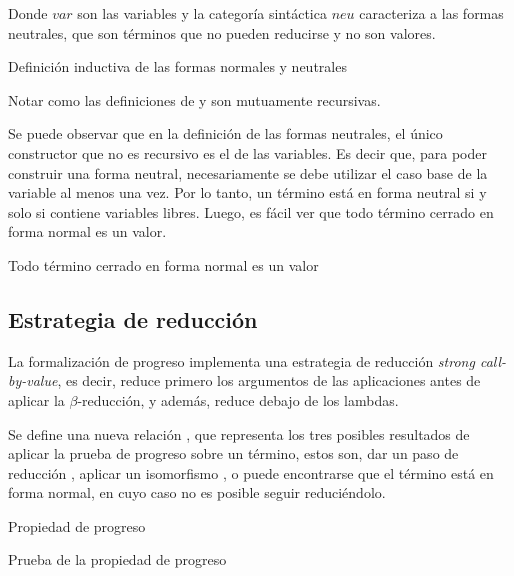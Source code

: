 Donde $var$ son las variables y la categoría sintáctica $neu$ caracteriza a las formas neutrales, que son términos que no pueden reducirse y no son valores.

\begin{codigo}
	Definición inductiva de las formas normales y neutrales
\end{codigo}

Notar como las definiciones de \const{$\Uparrow$} y \const{$\Downarrow$} son mutuamente recursivas.

Se puede observar que en la definición de las formas neutrales, el único constructor que no es recursivo es el de las variables.
Es decir que, para poder construir una forma neutral, necesariamente se debe utilizar el caso base de la variable al menos una vez.
Por lo tanto, un término está en forma neutral si y solo si contiene variables libres.
Luego, es fácil ver que todo término cerrado en forma normal es un valor.

\begin{codigo}
	Todo término cerrado en forma normal es un valor
\end{codigo}

\subsection{Estrategia de reducción}

La formalización de progreso implementa una estrategia de reducción \textit{strong call-by-value}, es decir, reduce primero los argumentos de las aplicaciones antes de aplicar la $\beta$-reducción, y además, reduce debajo de los lambdas.

Se define una nueva relación , que representa los tres posibles resultados de aplicar la prueba de progreso sobre un término, estos son, dar un paso de reducción \type{$\_\hookrightarrow\_$}, aplicar un isomorfismo \type{$\_\rightleftarrows\_$}, o puede encontrarse que el término está en forma normal, en cuyo caso no es posible seguir reduciéndolo.

\begin{codigo}
	Propiedad de progreso
\end{codigo}

\begin{codigo}
	Prueba de la propiedad de progreso
\end{codigo}

